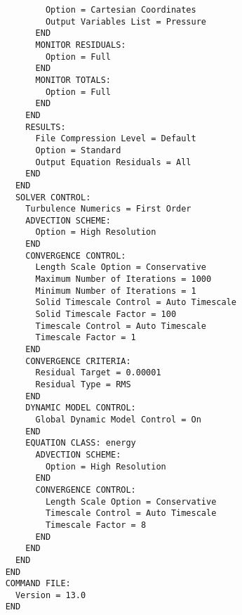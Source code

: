\begin{verbatim}
            Option = Cartesian Coordinates
            Output Variables List = Pressure
          END
          MONITOR RESIDUALS:
            Option = Full
          END
          MONITOR TOTALS:
            Option = Full
          END
        END
        RESULTS:
          File Compression Level = Default
          Option = Standard
          Output Equation Residuals = All
        END
      END
      SOLVER CONTROL:
        Turbulence Numerics = First Order
        ADVECTION SCHEME:
          Option = High Resolution
        END
        CONVERGENCE CONTROL:
          Length Scale Option = Conservative
          Maximum Number of Iterations = 1000
          Minimum Number of Iterations = 1
          Solid Timescale Control = Auto Timescale
          Solid Timescale Factor = 100
          Timescale Control = Auto Timescale
          Timescale Factor = 1
        END
        CONVERGENCE CRITERIA:
          Residual Target = 0.00001
          Residual Type = RMS
        END
        DYNAMIC MODEL CONTROL:
          Global Dynamic Model Control = On
        END
        EQUATION CLASS: energy
          ADVECTION SCHEME:
            Option = High Resolution
          END
          CONVERGENCE CONTROL:
            Length Scale Option = Conservative
            Timescale Control = Auto Timescale
            Timescale Factor = 8
          END
        END
      END
    END
    COMMAND FILE:
      Version = 13.0
    END
    \end{verbatim}
    \normalsize
